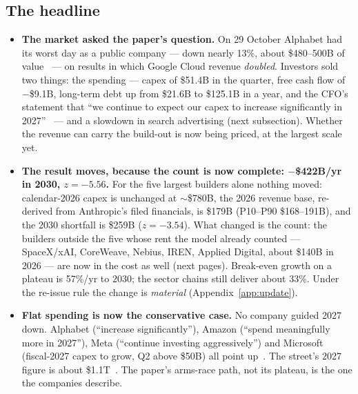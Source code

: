 \documentclass[11pt,letterpaper]{article}
\begin{document}
\subsection*{The headline}\label{ag:headline}
\begin{itemize}
\item \textbf{The market asked the paper's question.} On 29 October Alphabet had its worst day as a public company --- down nearly 13\%, about \$480--500B of value~\cite{ref:cnbc_goog_1029,ref:yahoo_goog_1029} --- on results in which Google Cloud revenue \emph{doubled}. Investors sold two things: the spending --- capex of \$51.4B in the quarter, free cash flow of $-$\$9.1B, long-term debt up from \$21.6B to \$125.1B in a year, and the CFO's statement that ``we continue to expect our capex to increase significantly in 2027''~\cite{ref:alphabet_q3_2026,ref:yahoo_nasdaq_1029} --- and a slowdown in search advertising (next subsection). Whether the revenue can carry the build-out is now being priced, at the largest scale yet.
\item \textbf{The result moves, because the count is now complete: $-$\$422B/yr in 2030, $z=-5.56$.} For the five largest builders alone nothing moved: calendar-2026 capex is unchanged at $\sim$\$780B, the 2026 revenue base, re-derived from Anthropic's filed financials, is \$179B (P10--P90 \$168--191B), and the 2030 shortfall is \$259B ($z=-3.54$). What changed is the count: the builders outside the five whose rent the model already counted --- SpaceX/xAI, CoreWeave, Nebius, IREN, Applied Digital, about \$140B in 2026 --- are now in the cost as well (next pages). Break-even growth on a plateau is 57\%/yr to 2030; the sector chains still deliver about 33\%. Under the re-issue rule the change is \emph{material} (Appendix~\ref{app:update}).
\item \textbf{Flat spending is now the conservative case.} No company guided 2027 down. Alphabet (``increase significantly''), Amazon (``spend meaningfully more in 2027''), Meta (``continue investing aggressively'') and Microsoft (fiscal-2027 capex to grow, Q2 above \$50B) all point up~\cite{ref:alphabet_q3_2026,ref:amzn_q3_2026,ref:meta_q3_2026,ref:msft_q1fy27}. The street's 2027 figure is about \$1.1T~\cite{ref:gs_capex_bbg}. The paper's arms-race path, not its plateau, is the one the companies describe.
\end{itemize}
\end{document}
